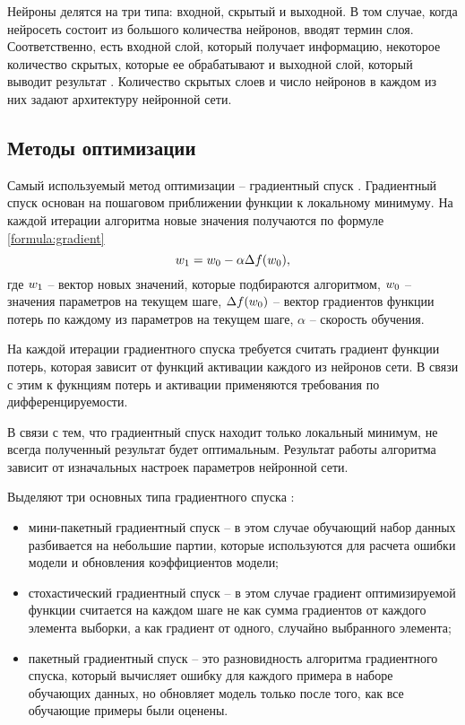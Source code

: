 Нейроны делятся на три типа: входной, скрытый и выходной. В том случае, когда нейросеть состоит из большого количества нейронов, вводят термин слоя. Соответственно, есть входной слой, который получает информацию, некоторое количество скрытых, которые ее обрабатывают и выходной слой, который выводит результат \cite{neuro_architecture}. Количество скрытых слоев и число нейронов в каждом из них задают архитектуру нейронной сети.

\subsection{Методы оптимизации}
Самый используемый метод оптимизации -- градиентный спуск \cite{gradient}. Градиентный спуск основан на пошаговом приближении функции к локальному минимуму. На каждой итерации алгоритма новые значения получаются по формуле \ref{formula:gradient}
\begin{equation}\label{formula:gradient}
w_{\rm{1}} = w_{\rm{0}} - \alpha\Delta f(w_{\rm{0}}),
\end{equation}
где $w_{\rm{1}}$ -- вектор новых значений, которые подбираются алгоритмом, $w_{\rm{0}}$ -- значения параметров на текущем шаге, $\Delta f(w_{\rm{0}})$ -- вектор градиентов функции потерь по каждому из параметров на текущем шаге, $\alpha$ -- скорость обучения. 

На каждой итерации градиентного спуска требуется считать градиент функции потерь, которая зависит от функций активации каждого из нейронов сети. В связи с этим к фукнциям потерь и активации применяются требования по дифференцируемости.

В связи с тем, что градиентный спуск находит только локальный минимум, не всегда полученный результат будет оптимальным. Результат работы алгоритма зависит от изначальных настроек параметров нейронной сети.

Выделяют три основных типа градиентного спуска \cite{gradient}:
\begin{itemize}
	\item мини-пакетный градиентный спуск -- в этом случае обучающий набор данных разбивается на небольшие партии, которые используются для расчета ошибки модели и обновления коэффициентов модели;
	\item стохастический градиентный спуск -- в этом случае градиент
	оптимизируемой функции считается на каждом шаге не как сумма
	градиентов от каждого элемента выборки, а как градиент от одного,
	случайно выбранного элемента;
	\item пакетный градиентный спуск -- это разновидность
	алгоритма градиентного спуска, который вычисляет ошибку для
	каждого примера в наборе обучающих данных, но обновляет модель
	только после того, как все обучающие примеры были оценены.
\end{itemize}

